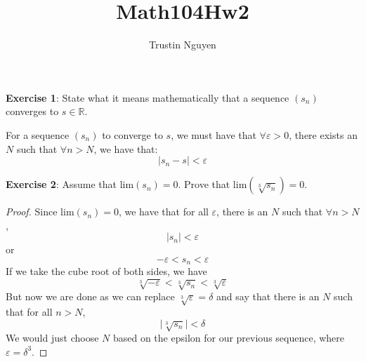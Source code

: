 \documentclass{article}
\title{Math104Hw2}
\author{Trustin Nguyen}
\begin{document}
    \maketitle

\reversemarginpar

\textbf{Exercise 1}: State what it means mathematically that a sequence $(s_{n})$ converges to $s \in \mathbb{R}$.
    \begin{answer}
        For a sequence $(s_{n})$ to converge to $s$, we must have that $\forall \varepsilon > 0$, there exists an $N$ such that $\forall n > N$, we have that:
            \begin{equation*}
                \lvert s_{n} - s \rvert < \varepsilon
            \end{equation*}
    \end{answer}

\textbf{Exercise 2}: Assume that $\text{lim}(s_{n}) = 0$. Prove that $\text{lim}(\sqrt[3]{s_{n}}) = 0$.
    \begin{proof}
        Since $\text{lim}(s_{n}) = 0$, we have that for all $\varepsilon$, there is an $N$ such that $\forall n > N$, 
            \begin{equation*}
                \lvert s_{n} \rvert < \varepsilon
            \end{equation*}
        or
            \begin{equation*}
                -\varepsilon < s_{n} < \varepsilon
            \end{equation*}
        If we take the cube root of both sides, we have
            \begin{equation*}
                \sqrt[3]{-\varepsilon} < \sqrt[3]{s_{n}} <  \sqrt[3]{\varepsilon}
            \end{equation*}
        But now we are done as we can replace $\sqrt[3]{\varepsilon} = \delta$ and say that there is an $N$ such that for all $n > N$,
            \begin{equation*}
                \lvert \sqrt[3]{s_{n}} \rvert <  \delta
            \end{equation*}
        We would just choose $N$ based on the epsilon for our previous sequence, where $\varepsilon = \delta^{3}$.
    \end{proof}
\end{document}
